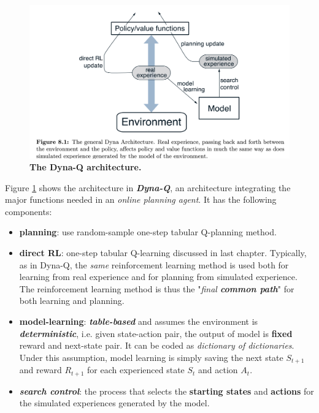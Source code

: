 \documentclass[11pt]{article}
\begin{document}
\begin{figure}
\begin{minipage}[t]{1\linewidth}
  \centering
  \centerline{\includegraphics[scale = 0.3]{Dyna_Q.png}}
\end{minipage}
\caption{\footnotesize{\textbf{The Dyna-Q architecture. }}}
\label{fig: Dyna_Q}
\end{figure}
Figure \ref{fig: Dyna_Q} shows the architecture in \textbf{\emph{Dyna-Q}},  an architecture integrating the major functions needed in an \emph{online planning agent}.  It has the following components:
\begin{itemize}
\item \textbf{planning}:  use  random-sample one-step tabular Q-planning method. 
\item \textbf{direct RL}:  one-step tabular Q-learning discussed in last chapter. Typically, as in Dyna-Q, the \emph{same} reinforcement learning method is used both for learning from real experience and for planning from simulated experience. The reinforcement learning method is thus the "\emph{final \textbf{common path}}" for both learning and planning.
\item \textbf{model-learning}: \textbf{\emph{table-based}} and assumes the environment is \textbf{\emph{deterministic}}, i.e. given state-action pair, the output of model is \textbf{fixed} reward and next-state pair. It can be coded as \emph{dictionary of dictionaries}. Under this assumption, model learning is simply saving the next state $S_{t+1}$ and reward $R_{t+1}$ for each experienced state $S_{t}$ and action $A_{t}$.
\item \textbf{\emph{search control}}:  the process that selects the \textbf{starting states} and \textbf{actions} for the simulated experiences generated by the model. 

\end{itemize} 
\end{document}
